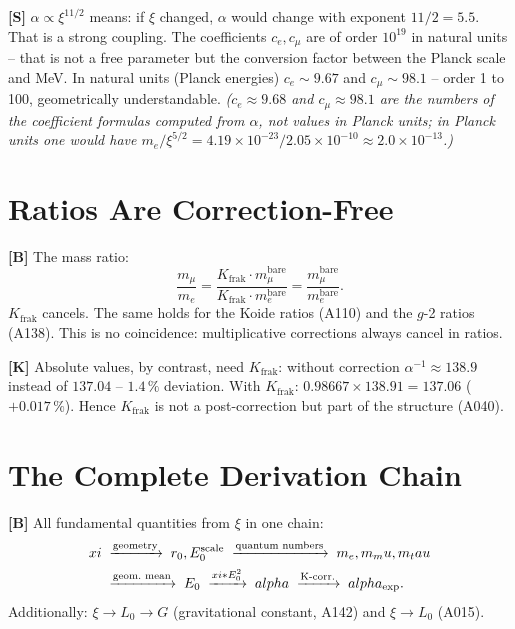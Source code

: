 \textbf{[S]} $\alpha\propto\xi^{11/2}$ means: if $\xi$ changed, $\alpha$ would
change with exponent $11/2=5{.}5$. That is a strong coupling. The coefficients
$c_e,c_\mu$ are of order $10^{19}$ in natural units -- that is not a free
parameter but the conversion factor between the Planck scale and MeV. In natural
units (Planck energies) $c_e\sim9{.}67$ and $c_\mu\sim98{.}1$ -- order 1 to 100,
geometrically understandable.
\textit{($c_e\approx9.68$ and $c_\mu\approx98.1$ are the numbers of the coefficient formulas computed from $\alpha$, not values in Planck units; in Planck units one would have $m_e/\xi^{5/2} = 4.19\times10^{-23}/2.05\times10^{-10}\approx2.0\times10^{-13}$.)}

\section{Ratios Are Correction-Free}

\textbf{[B]} The mass ratio:
\[
  \frac{m_\mu}{m_e}
  = \frac{K_\text{frak}\cdot m_\mu^\text{bare}}{K_\text{frak}\cdot m_e^\text{bare}}
  = \frac{m_\mu^\text{bare}}{m_e^\text{bare}}.
\]
$K_\text{frak}$ cancels. The same holds for the Koide ratios (A110) and the
$g$-2 ratios (A138). This is no coincidence: multiplicative corrections always
cancel in ratios.

\textbf{[K]} Absolute values, by contrast, need $K_\text{frak}$: without
correction $\alpha^{-1}\approx138{.}9$ instead of $137{.}04$ -- $1{.}4\,\%$
deviation. With $K_\text{frak}$: $0{.}98667\times138{.}91 = 137{.}06$ ($+0{.}017\,\%$).
 Hence $K_\text{frak}$ is not a
post-correction but part of the structure (A040).

\section{The Complete Derivation Chain}

\textbf{[B]} All fundamental quantities from $\xi$ in one chain:
\begin{align}
  \xi &\;\xrightarrow{\text{geometry}}\; r_0,E_0^\text{scale}
       \;\xrightarrow{\text{quantum numbers}}\; m_e,m_\mu,m_\tau \notag\\
      &\;\xrightarrow{\text{geom.\ mean}}\; E_0
       \;\xrightarrow{\xi\cdot E_0^2}\; \alpha
       \;\xrightarrow{\text{K-corr.}}\; \alpha_\text{exp}. \notag
\end{align}
Additionally: $\xi\to L_0\to G$ (gravitational constant, A142) and $\xi\to L_0$ (A015).

